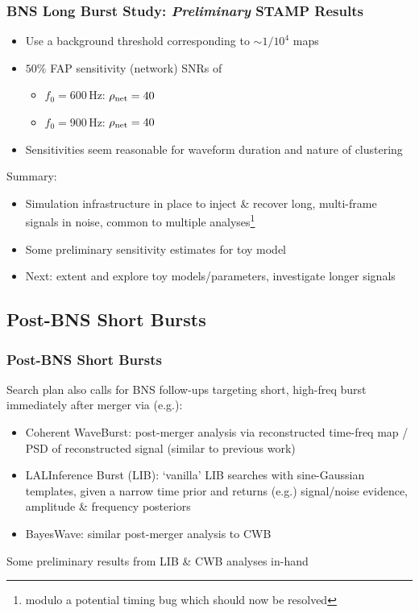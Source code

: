 \documentclass{beamer}
\begin{document}
\begin{frame}
    \frametitle{BNS Long Burst Study: \emph{Preliminary} STAMP Results}
    \begin{itemize}
        \item Use a background threshold corresponding to $\sim1/10^4$ maps
        \item $50\%$ FAP sensitivity (network) SNRs of
            \begin{itemize}
                \item $f_0=600$\,Hz: $\rho_{\rm{net}}=40$
                \item $f_0=900$\,Hz: $\rho_{\rm{net}}=40$
            \end{itemize}
        \item Sensitivities seem reasonable for waveform duration and nature of
            clustering
    \end{itemize}
    Summary:
    \begin{itemize}
        \item Simulation infrastructure in place to inject \& recover long,
            multi-frame signals in noise, common to multiple
            analyses\footnote{modulo a potential timing bug which should now be
            resolved}
        \item Some preliminary sensitivity estimates for toy model
        \item Next: extent and explore toy models/parameters, investigate longer
            signals
    \end{itemize}

\end{frame}

\subsection{Post-BNS Short Bursts}

\begin{frame}
    \frametitle{Post-BNS Short Bursts}
    Search plan also calls for BNS follow-ups targeting short, high-freq burst
    immediately after merger via (e.g.):
    \begin{itemize}
        \item Coherent WaveBurst: post-merger analysis via reconstructed
            time-freq map / PSD of reconstructed signal (similar to previous work)
        \item LALInference Burst (LIB): `vanilla' LIB searches with sine-Gaussian
            templates, given a narrow time prior and returns (e.g.) signal/noise
            evidence, amplitude \& frequency posteriors
        \item BayesWave: similar post-merger analysis to CWB
    \end{itemize}
    Some preliminary results from LIB \& CWB analyses in-hand
\end{frame}
\end{document}
